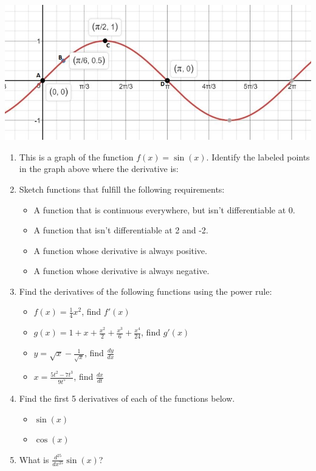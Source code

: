 \documentclass{article}
\begin{document}
\includegraphics[width=\textwidth]{1.JPG}
\begin{enumerate}
\item This is a graph of the function $f(x) = \sin(x)$. Identify the labeled points in the graph above where the derivative is:\\
\item Sketch functions that fulfill the following requirements:
\begin{itemize}
\item A function that is continuous everywhere, but isn't differentiable at 0.
\item A function that isn't differentiable at 2 and -2.
\item A function whose derivative is always positive.
\item A function whose derivative is always negative.
\end{itemize}
\item Find the derivatives of the following functions using the power rule:
\begin{itemize}
\item $ f(x) = \frac{1}{4}x^2 $, find $f'(x)$
\item $ g(x) = 1 + x + \frac{x^2}{2} + \frac{x^3}{6} + \frac{x^4}{24} $, find $g'(x)$
\item $ y = \sqrt{x}-\frac{1}{\sqrt{x}} $, find $\frac{dy}{dx}$
\item $ x = \frac{5t^2 - 7t^3}{9t^5} $, find $\frac{dx}{dt}$
\end{itemize}
\item Find the first 5 derivatives of each of the functions below.
\begin{itemize}
    \item $\sin(x)$
    \item $\cos(x)$
\end{itemize}
\item What is $\frac{d^{25}}{dx^{25}} \sin(x)$?
\end{enumerate}
\end{document}
